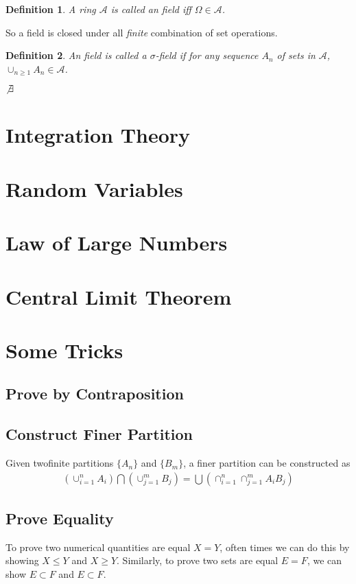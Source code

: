 \documentclass{article}
\newcommand{\mA}{\mathscr{A}}
\newtheorem{definition}{Definition}[section]
\begin{document}
\begin{definition}
	A {\em{ring}} $\mA$ is called an {\em{field}} iff $\Omega \in \mA$.
\end{definition}
So a field is closed under all {\em{finite}} combination of set operations.


\begin{definition}
	An {\em{field}} is called a {\em{$\sigma$-field}} if for any sequence ${A_n}$ of sets in $\mA$, $\cup_{n \ge 1} A_n \in \mA$.
\end{definition}

$\not \exists$

\section{Integration Theory}
\section{Random Variables}
\section{Law of Large Numbers}
\section{Central Limit Theorem}

\section{Some Tricks}
\subsection{Prove by Contraposition}

\subsection{Construct Finer Partition}
Given twofinite partitions $\{A_n\}$ and $\{B_m\}$, a finer partition can be constructed as
\begin{align*}
	(\cup_{i=1}^n A_i) \bigcap (\cup_{j=1}^m B_j) = \bigcup (\cap_{i=1}^n \cap_{j=1}^m A_i B_j)
\end{align*}

\subsection{Prove Equality}
To prove two numerical quantities are equal $X=Y$, often times we can do this by showing $X \le Y$ and $X \ge Y$. Similarly, to prove two sets are equal $E = F$, we can show $E \subset F$ and $E \subset F$.
\end{document}
